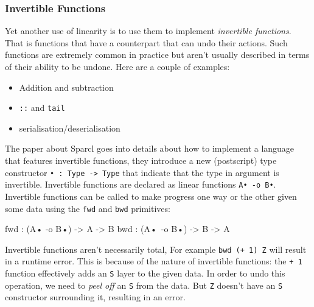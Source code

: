 \documentclass[
]{article}
\newenvironment{Shaded}{}{}
\newcommand{\DataTypeTok}[1]{\textcolor[rgb]{0.56,0.13,0.00}{#1}}
\newcommand{\NormalTok}[1]{#1}
\newcommand{\OperatorTok}[1]{\textcolor[rgb]{0.40,0.40,0.40}{#1}}
\newcommand{\OtherTok}[1]{\textcolor[rgb]{0.00,0.44,0.13}{#1}}
\providecommand{\tightlist}{%
  \setlength{\itemsep}{0pt}\setlength{\parskip}{0pt}}
\begin{document}
\hypertarget{invertible-functions}{%
\subsubsection{Invertible Functions}\label{invertible-functions}}

Yet another use of linearity is to use them to implement
\emph{invertible functions}. That is functions that have a counterpart
that can undo their actions. Such functions are extremely common in
practice but aren't usually described in terms of their ability to be
undone. Here are a couple of examples:

\begin{itemize}
\tightlist
\item
  Addition and subtraction
\item
  \texttt{::} and \texttt{tail}
\item
  serialisation/deserialisation
\end{itemize}

The paper about Sparcl\cite{invertible_functions} goes into details
about how to implement a language that features invertible functions,
they introduce a new (postscript) type constructor
\texttt{•\ :\ Type\ -\textgreater{}\ Type} that indicate that the type
in argument is invertible. Invertible functions are declared as linear
functions \texttt{A•\ -o\ B•}. Invertible functions can be called to
make progress one way or the other given some data using the
\texttt{fwd} and \texttt{bwd} primitives:

\begin{Shaded}
\begin{Highlighting}[]
\NormalTok{fwd }\OperatorTok{:}\NormalTok{ (}\DataTypeTok{A}\NormalTok{• }\OperatorTok{{-}}\NormalTok{o }\DataTypeTok{B}\NormalTok{•) }\OtherTok{{-}\textgreater{}} \DataTypeTok{A} \OtherTok{{-}\textgreater{}} \DataTypeTok{B}
\NormalTok{bwd }\OperatorTok{:}\NormalTok{ (}\DataTypeTok{A}\NormalTok{• }\OperatorTok{{-}}\NormalTok{o }\DataTypeTok{B}\NormalTok{•) }\OtherTok{{-}\textgreater{}} \DataTypeTok{B} \OtherTok{{-}\textgreater{}} \DataTypeTok{A}
\end{Highlighting}
\end{Shaded}

Invertible functions aren't necessarily total, For example
\texttt{bwd\ (+\ 1)\ Z} will result in a runtime error. This is because
of the nature of invertible functions: the \texttt{+\ 1} function
effectively adds an \texttt{S} layer to the given data. In order to undo
this operation, we need to \emph{peel off} an \texttt{S} from the data.
But \texttt{Z} doesn't have an \texttt{S} constructor surrounding it,
resulting in an error.
\end{document}
